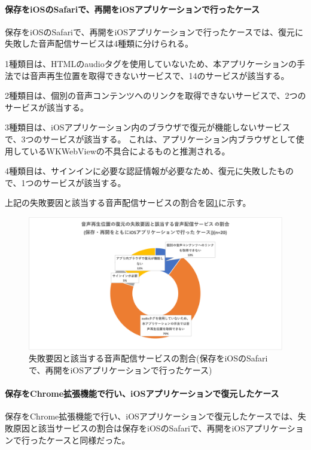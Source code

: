 \paragraph{保存をiOSのSafariで、再開をiOSアプリケーションで行ったケース}
保存をiOSのSafariで、再開をiOSアプリケーションで行ったケースでは、復元に失敗した音声配信サービスは4種類に分けられる。

1種類目は、HTMLのaudioタグを使用していないため、本アプリケーションの手法では音声再生位置を取得できないサービスで、14のサービスが該当する。

2種類目は、個別の音声コンテンツへのリンクを取得できないサービスで、2つのサービスが該当する。

3種類目は、iOSアプリケーション内のブラウザで復元が機能しないサービスで、3つのサービスが該当する。
これは、アプリケーション内ブラウザとして使用しているWKWebViewの不具合によるものと推測される。

4種類目は、サインインに必要な認証情報が必要なため、復元に失敗したもので、1つのサービスが該当する。

上記の失敗要因と該当する音声配信サービスの割合を図\ref{fig:evl-consideration-audio-cause-ratio-ios}に示す。

\begin{figure}[htbp]
  \label{fig:evl-consideration-audio-cause-ratio-ios}
  \begin{center}
    \includegraphics[bb=0 0 738.22222222 386.88888889,width=15cm]{img/060_evaluation/consideration/audio/cause-ratio-ios.pdf}
  \end{center}
  \caption{失敗要因と該当する音声配信サービスの割合(保存をiOSのSafariで、再開をiOSアプリケーションで行ったケース)}
\end{figure}

\paragraph{保存をChrome拡張機能で行い、iOSアプリケーションで復元したケース}
保存をChrome拡張機能で行い、iOSアプリケーションで復元したケースでは、失敗原因と該当サービスの割合は保存をiOSのSafariで、再開をiOSアプリケーションで行ったケースと同様だった。

